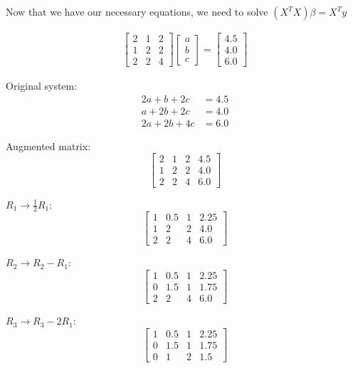 \documentclass[12pt]{article}
\begin{document}
Now that we have our necessary equations, we need to solve $(X^TX)\beta = X^Ty$

\begin{gather}
     \begin{bmatrix}
    2 & 1 & 2 \\
    1 & 2 & 2 \\
    2 & 2 & 4
    \end{bmatrix}
    \begin{bmatrix}
        a \\ b \\ c
    \end{bmatrix}
    = 
    \begin{bmatrix}
        4.5 \\
        4.0 \\
        6.0
    \end{bmatrix}
\end{gather}

Original system:
\begin{align}
2a + b + 2c &= 4.5 \tag{1} \\
a + 2b + 2c &= 4.0 \tag{2} \\
2a + 2b + 4c &= 6.0 \tag{3}
\end{align}

Augmented matrix:
\[
\left[\begin{array}{ccc|c}
2 & 1 & 2 & 4.5 \\
1 & 2 & 2 & 4.0 \\
2 & 2 & 4 & 6.0
\end{array}\right]
\]

$R_1 \to \frac{1}{2}R_1$:
\[
\left[\begin{array}{ccc|c}
1 & 0.5 & 1 & 2.25 \\
1 & 2 & 2 & 4.0 \\
2 & 2 & 4 & 6.0
\end{array}\right]
\]

$R_2 \to R_2 - R_1$:
\[
\left[\begin{array}{ccc|c}
1 & 0.5 & 1 & 2.25 \\
0 & 1.5 & 1 & 1.75 \\
2 & 2 & 4 & 6.0
\end{array}\right]
\]

$R_3 \to R_3 - 2R_1$:
\[
\left[\begin{array}{ccc|c}
1 & 0.5 & 1 & 2.25 \\
0 & 1.5 & 1 & 1.75 \\
0 & 1 & 2 & 1.5
\end{array}\right]
\]
\end{document}
